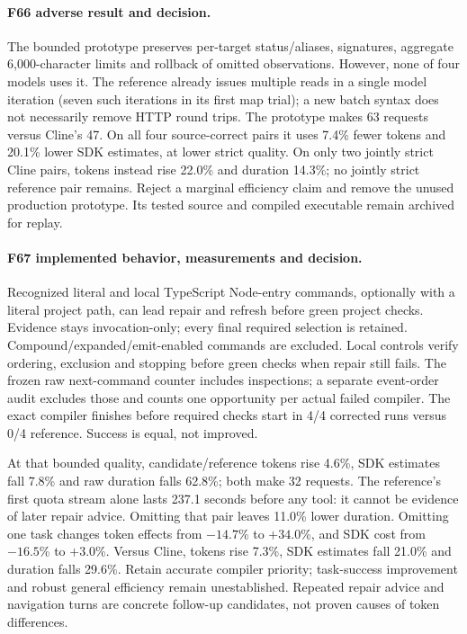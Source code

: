 \documentclass[11pt,a4paper]{article}
\newcommand{\code}[1]{\texttt{\detokenize{#1}}}
\begin{document}
\paragraph{F66 adverse result and decision.}
The bounded prototype preserves per-target status/aliases, signatures, aggregate
6,000-character limits and rollback of omitted observations. However, none of four
models uses it. The reference already issues multiple reads in a single model
iteration (seven such iterations in its first map trial); a new batch syntax does
not necessarily remove HTTP round trips. The prototype makes 63 requests versus
Cline's 47. On all four source-correct pairs it uses 7.4\% fewer tokens and 20.1\%
lower SDK estimates, at lower strict quality. On only two jointly strict Cline
pairs, tokens instead rise 22.0\% and duration 14.3\%; no jointly strict reference
pair remains. Reject a marginal efficiency claim and remove the unused production
prototype. Its tested source and compiled executable remain archived for replay.

\paragraph{F67 implemented behavior, measurements and decision.}
Recognized literal \code{tsc --noEmit} and local TypeScript Node-entry commands,
optionally with a literal project path, can lead repair and refresh before green
project checks. Evidence stays invocation-only; every final required selection is
retained. Compound/expanded/emit-enabled commands are excluded. Local controls
verify ordering, exclusion and stopping before green checks when repair still fails.
The frozen raw next-command counter includes inspections; a separate event-order
audit excludes those and counts one opportunity per actual failed compiler.
The exact compiler finishes before required checks start in 4/4 corrected runs
versus 0/4 reference. Success is equal, not improved.

At that bounded quality, candidate/reference tokens rise 4.6\%, SDK estimates fall
7.8\% and raw duration falls 62.8\%; both make 32 requests. The reference's first
quota stream alone lasts 237.1 seconds before any tool: it cannot be evidence of
later repair advice. Omitting that pair leaves 11.0\% lower duration. Omitting one
task changes token effects from $-14.7$\% to $+34.0$\%, and SDK cost from $-16.5$\%
to $+3.0$\%. Versus Cline, tokens rise 7.3\%, SDK estimates fall 21.0\% and duration
falls 29.6\%. Retain accurate compiler priority; task-success improvement and robust
general efficiency remain unestablished. Repeated repair advice and navigation
turns are concrete follow-up candidates, not proven causes of token differences.
\end{document}

